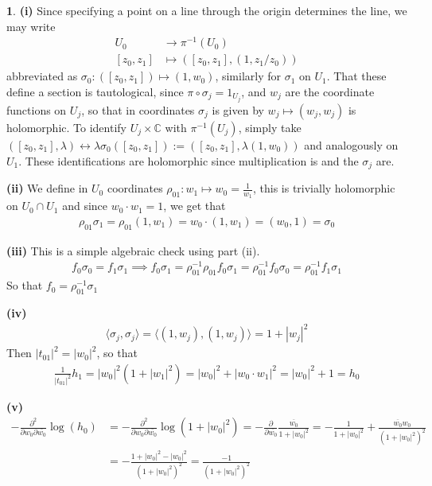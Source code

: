 \documentclass[10.5pt]{article}
\theoremstyle{definition}
\newtheorem{pb}{}
\newcommand{\gen}[1]{\langle#1\rangle}
\newcommand{\abs}[1]{\left\vert#1\right\vert}
\newcommand{\pwpw}{\frac{\partial^2}{\partial w_0 \partial \bar{w_0}}}
\begin{document}
    \begin{pb}
        \textbf{(i)} Since specifying a point on a line through the origin determines the line, we may write
        \begin{align*}
            U_0 &\to \pi^{-1}(U_0) \\
            [z_0,z_1] &\mapsto ([z_0,z_1],(1,z_1/z_0))
        \end{align*}
        abbreviated as \(\sigma_0: ([z_0,z_1]) \mapsto (1,w_0)\), similarly for \(\sigma_1\) on \(U_1\). That these define a section is tautological, since \(\pi\circ \sigma_j = 1_{U_j}\), and \(w_j\) are the coordinate functions on \(U_j\), so that in coordinates \(\sigma_j\) is given by \(w_j \mapsto (w_j,w_j)\) is holomorphic. To identify \(U_j \times \mathbb{C}\) with \(\pi^{-1}(U_j)\), simply take \(([z_0,z_1],\lambda) \leftrightarrow \lambda\sigma_0([z_0,z_1]) := ([z_0,z_1],\lambda(1, w_0))\) and analogously on \(U_1\). These identifications are holomorphic since multiplication is and the \(\sigma_j\) are.

        \textbf{(ii)} We define in \(U_0\) coordinates \(\rho_{01}: w_1 \mapsto w_0 = \frac{1}{w_1}\), this is trivially holomorphic on \(U_0 \cap U_1\) and since \(w_0\cdot w_1 = 1\), we get that
        \begin{align*}
            \rho_{01}\sigma_1 = \rho_{01}(1,w_1) = w_0\cdot(1,w_1) = (w_0,1) = \sigma_0
        \end{align*}

        \textbf{(iii)} This is a simple algebraic check using part (ii).
        \begin{align*}
            f_0 \sigma_0 = f_1 \sigma_1 \implies f_0 \sigma_1 =  \rho_{01}^{-1}\rho_{01}f_0 \sigma_1 = \rho_{01}^{-1}f_0 \sigma_0 = \rho_{01}^{-1}f_1 \sigma_1
        \end{align*}
        So that \(f_0 = \rho_{01}^{-1}\sigma_1\)

        \textbf{(iv)}
        \begin{align*}
            \gen{\sigma_j,\sigma_j} = \gen{(1,w_j),(1,w_j)} = 1+\abs{w_j}^2
        \end{align*}
        Then \(\abs{t_{01}}^2 = \abs{w_0}^2\), so that
        \begin{align*}
            \frac{1}{\abs{t_{01}}^2}h_1 = \abs{w_0}^2(1 + \abs{w_1}^2) = \abs{w_0}^2 + \abs{w_0\cdot w_1}^2 = \abs{w_0}^2 + 1 = h_0
        \end{align*}

        \textbf{(v)}
        \begin{align}
            -\pwpw \log(h_0) &= -\pwpw \log(1 + \abs{w_0}^2) = -\frac{\partial}{\partial \overline{w_0}}\frac{\overline{w_0}}{1 + \abs{w_0}^2} = -\frac{1}{1 + \abs{w_0}^2} + \frac{\overline{w_0}w_0}{(1 + \abs{w_0}^2)^2} \\
            &= -\frac{1 + \abs{w_0}^2 - \abs{w_0}^2}{(1 + \abs{w_0}^2)^2} = \frac{-1}{(1 + \abs{w_0}^2)^2} \label{curvaturecalc}
        \end{align}


\end{pb}
\end{document}

